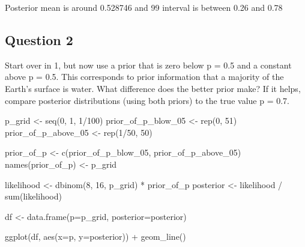 \documentclass[
]{article}
\newenvironment{Shaded}{\begin{snugshade}}{\end{snugshade}}
\newcommand{\AttributeTok}[1]{\textcolor[rgb]{0.77,0.63,0.00}{#1}}
\newcommand{\DecValTok}[1]{\textcolor[rgb]{0.00,0.00,0.81}{#1}}
\newcommand{\FunctionTok}[1]{\textcolor[rgb]{0.00,0.00,0.00}{#1}}
\newcommand{\NormalTok}[1]{#1}
\newcommand{\OtherTok}[1]{\textcolor[rgb]{0.56,0.35,0.01}{#1}}
\newcommand{\SpecialCharTok}[1]{\textcolor[rgb]{0.00,0.00,0.00}{#1}}
\begin{document}
Posterior mean is around 0.528746 and 99 interval is between 0.26 and
0.78

\hypertarget{question-2}{%
\subsection{Question 2}\label{question-2}}

Start over in 1, but now use a prior that is zero below p = 0.5 and a
constant above p = 0.5. This corresponds to prior information that a
majority of the Earth's surface is water. What difference does the
better prior make? If it helps, compare posterior distributions (using
both priors) to the true value p = 0.7.

\begin{Shaded}
\begin{Highlighting}[]
\NormalTok{p\_grid }\OtherTok{\textless{}{-}} \FunctionTok{seq}\NormalTok{(}\DecValTok{0}\NormalTok{, }\DecValTok{1}\NormalTok{, }\DecValTok{1}\SpecialCharTok{/}\DecValTok{100}\NormalTok{)}
\NormalTok{prior\_of\_p\_blow\_05 }\OtherTok{\textless{}{-}} \FunctionTok{rep}\NormalTok{(}\DecValTok{0}\NormalTok{, }\DecValTok{51}\NormalTok{)}
\NormalTok{prior\_of\_p\_above\_05 }\OtherTok{\textless{}{-}} \FunctionTok{rep}\NormalTok{(}\DecValTok{1}\SpecialCharTok{/}\DecValTok{50}\NormalTok{, }\DecValTok{50}\NormalTok{)}

\NormalTok{prior\_of\_p }\OtherTok{\textless{}{-}} \FunctionTok{c}\NormalTok{(prior\_of\_p\_blow\_05, prior\_of\_p\_above\_05)}
\FunctionTok{names}\NormalTok{(prior\_of\_p) }\OtherTok{\textless{}{-}}\NormalTok{ p\_grid}


\NormalTok{likelihood }\OtherTok{\textless{}{-}} \FunctionTok{dbinom}\NormalTok{(}\DecValTok{8}\NormalTok{, }\DecValTok{16}\NormalTok{, p\_grid) }\SpecialCharTok{*}\NormalTok{ prior\_of\_p}
\NormalTok{posterior }\OtherTok{\textless{}{-}}\NormalTok{ likelihood }\SpecialCharTok{/} \FunctionTok{sum}\NormalTok{(likelihood)}

\NormalTok{df }\OtherTok{\textless{}{-}} \FunctionTok{data.frame}\NormalTok{(}\AttributeTok{p=}\NormalTok{p\_grid, }\AttributeTok{posterior=}\NormalTok{posterior)}

\FunctionTok{ggplot}\NormalTok{(df, }\FunctionTok{aes}\NormalTok{(}\AttributeTok{x=}\NormalTok{p, }\AttributeTok{y=}\NormalTok{posterior)) }\SpecialCharTok{+} \FunctionTok{geom\_line}\NormalTok{() }
\end{Highlighting}
\end{Shaded}
\end{document}
